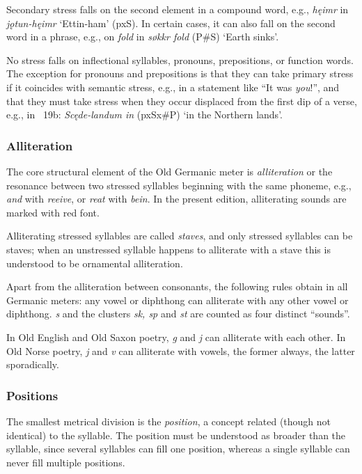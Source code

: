     Secondary stress falls on the second element in a compound word, e.g., \emph{hęimr} in \emph{jǫtun-hęimr} ‘Ettin-ham’ (pxS).  In certain cases, it can also fall on the second word in a phrase, e.g., on \emph{fold} in \emph{søkkr fold} (P\#S) ‘Earth sinks’.

    No stress falls on inflectional syllables, pronouns, prepositions, or function words.  The exception for pronouns and prepositions is that they can take primary stress if it coincides with semantic stress, e.g., in a statement like “It was \emph{you}!”, and that they must take stress when they occur displaced from the first dip of a verse, e.g., in \Beowulf\ 19b: \emph{Scęde-landum in} (pxSx\#P) ‘in the Northern lands’.

    \subsubsection{Alliteration}

    The core structural element of the Old Germanic meter is \emph{alliteration} or the resonance between two stressed syllables beginning with the same phoneme, e.g., \emph{and} with \emph{reeive}, or \emph{reat} with \emph{bein}.  In the present edition, alliterating sounds are marked with red font.

    Alliterating stressed syllables are called \emph{staves}, and only stressed syllables can be staves; when an unstressed syllable happens to alliterate with a stave this is understood to be ornamental alliteration.

    Apart from the alliteration between consonants, the following rules obtain in all Germanic meters: any vowel or diphthong can alliterate with any other vowel or diphthong.  \emph{s} and the clusters \emph{sk, sp} and \emph{st} are counted as four distinct “sounds”.

    In Old English and Old Saxon poetry, \emph{g} and \emph{j} can alliterate with each other.  In Old Norse poetry, \emph{j} and \emph{v} can alliterate with vowels, the former always, the latter sporadically.

    \subsubsection{Positions}

    The smallest metrical division is the \emph{position}, a concept related (though not identical) to the syllable.  The position must be understood as broader than the syllable, since several syllables can fill one position, whereas a single syllable can never fill multiple positions.

